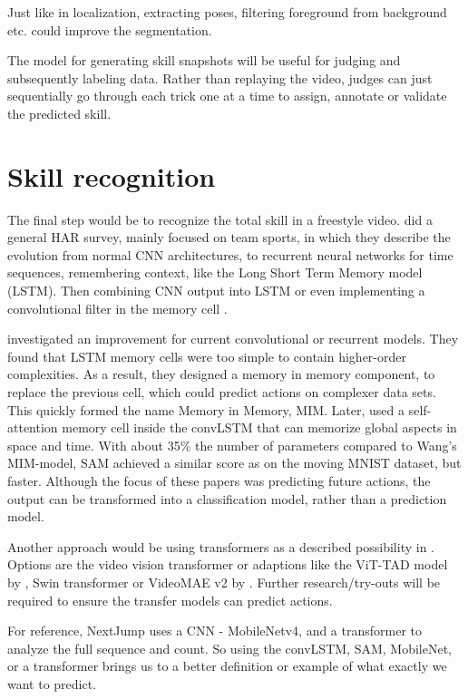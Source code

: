 Just like in localization, extracting poses, filtering foreground from background etc. could improve the segmentation.

The model for generating skill snapshots will
be useful for judging and subsequently labeling
data. Rather than replaying the video, judges can
just sequentially go through each trick one at a
time to assign, annotate or validate the predicted
skill.

\section{Skill recognition}
\label{subsec:bp-skill-recognition}

The final step would be to recognize the total skill in a freestyle video.
\textcite{Yin_2024} did a general HAR survey, mainly focused on team sports, in which they describe the evolution from normal CNN architectures, to recurrent neural networks for time sequences, remembering context, like the Long Short Term Memory model (LSTM). Then combining CNN output into LSTM or even implementing a convolutional filter in the memory cell \autocite{Shi_2015}.

\textcite{Wang_2019} investigated an improvement for current convolutional or recurrent models. They found that LSTM memory cells were too simple to contain higher-order complexities. As a result, they designed a memory in memory component, to replace the previous cell, which could predict actions on complexer data sets. This quickly formed the name Memory in Memory, MIM. Later, \textcite{Lin_2020} used a self-attention memory cell inside the convLSTM that can memorize global aspects in space and time. With about 35\% the number of parameters compared to Wang's MIM-model, SAM achieved a similar score as on the moving MNIST dataset, but faster. Although the focus of these papers was predicting future actions, the output can be transformed into a classification model, rather than a prediction model.

Another approach would be using transformers as a described possibility in \textcite{Yin_2024}. Options are the video vision transformer \autocite{Arnab2021} or adaptions like the ViT-TAD model by \textcite{Yang_2023}, Swin transformer \textcite{Liu_2021} or VideoMAE v2 by \textcite{Wang_2023}. Further research/try-outs will be required to ensure the transfer models can predict actions.

For reference, NextJump uses a CNN - MobileNetv4, \autocite{MobileNetv4_2024} and a transformer to analyze the full sequence and count. So using the convLSTM, SAM, MobileNet, or a transformer brings us to a better definition or example of what exactly we want to predict.


